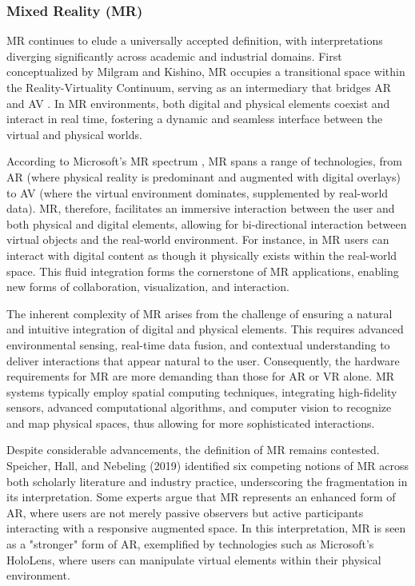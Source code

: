
\subsubsection{Mixed Reality (\ac{MR})}
    \ac{MR} continues to elude a universally accepted definition, with interpretations diverging significantly across academic and industrial domains. First conceptualized by Milgram and Kishino, MR occupies a transitional space within the Reality-Virtuality Continuum, serving as an intermediary that bridges \ac{AR} and \ac{AV} \cite{milgram1994}. In \ac{MR} environments, both digital and physical elements coexist and interact in real time, fostering a dynamic and seamless interface between the virtual and physical worlds.

    According to Microsoft’s \ac{MR} spectrum \cite{microsoft_mixed_reality}, \ac{MR} spans a range of technologies, from \ac{AR} (where physical reality is predominant and augmented with digital overlays) to \ac{AV} (where the virtual environment dominates, supplemented by real-world data). \ac{MR}, therefore, facilitates an immersive interaction between the user and both physical and digital elements, allowing for bi-directional interaction between virtual objects and the real-world environment. For instance, in \ac{MR} users can interact with digital content as though it physically exists within the real-world space. This fluid integration forms the cornerstone of \ac{MR} applications, enabling new forms of collaboration, visualization, and interaction.

    The inherent complexity of \ac{MR} arises from the challenge of ensuring a natural and intuitive integration of digital and physical elements. This requires advanced environmental sensing, real-time data fusion, and contextual understanding to deliver interactions that appear natural to the user. Consequently, the hardware requirements for \ac{MR} are more demanding than those for \ac{AR} or \ac{VR} alone. \ac{MR} systems typically employ spatial computing techniques, integrating high-fidelity sensors, advanced computational algorithms, and computer vision to recognize and map physical spaces, thus allowing for more sophisticated interactions.

    Despite considerable advancements, the definition of \ac{MR} remains contested. Speicher, Hall, and Nebeling (2019) identified six competing notions of MR across both scholarly literature and industry practice, underscoring the fragmentation in its interpretation. Some experts argue that \ac{MR} represents an enhanced form of \ac{AR}, where users are not merely passive observers but active participants interacting with a responsive augmented space. In this interpretation, \ac{MR} is seen as a "stronger" form of \ac{AR}, exemplified by technologies such as Microsoft's HoloLens, where users can manipulate virtual elements within their physical environment.

